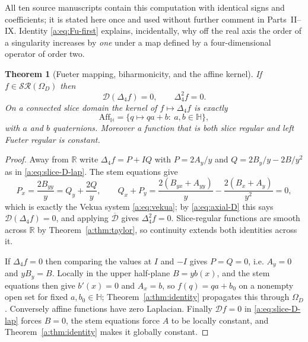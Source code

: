 \documentclass[11pt,a4paper]{article}
\numberwithin{equation}{section}
\newtheorem{theorem}{Theorem}[section]
\theoremstyle{definition}
\theoremstyle{remark}
\theoremstyle{plain}
\newcommand{\HH}{\mathbb H}
\newcommand{\RR}{\mathbb R}
\newcommand{\Dop}{\mathcal D}
\newcommand{\lap}{\Delta_4}
\newcommand{\SR}{\mathcal{SR}}
\newcommand{\Om}{\Omega}
\newcommand{\Aff}{\mathrm{Aff}_{\HH}}
\begin{document}
All ten source manuscripts contain this computation with identical signs and
coefficients; it is stated here once and used without further comment in
Parts~II--IX. Identity \eqref{a:eq:Fu-first} explains, incidentally, why off
the real axis the order of a singularity increases by \emph{one} under a map
defined by a four-dimensional operator of order two.

\begin{theorem}[Fueter mapping, biharmonicity, and the affine kernel]
\label{a:thm:fueter-map}
If $f\in\SR(\Om_D)$ then
\begin{equation}
 \Dop(\lap f)=0,\qquad \lap^2f=0 .
 \label{a:eq:fueter-map}
\end{equation}
On a connected slice domain the kernel of $f\mapsto\lap f$ is exactly
\[
 \Aff=\{q\mapsto qa+b:\ a,b\in\HH\},
\]
with $a$ and $b$ \emph{quaternions}. Moreover a function that is both slice
regular and left Fueter regular is constant.
\end{theorem}

\begin{proof}
Away from $\RR$ write $\lap f=P+IQ$ with $P=2A_y/y$ and $Q=2B_y/y-2B/y^2$ as
in \eqref{a:eq:slice-D-lap}. The stem equations give
\[
 P_x=\frac{2B_{yy}}{y}=Q_y+\frac{2Q}{y},
 \qquad
 Q_x+P_y=\frac{2(B_{yx}+A_{yy})}{y}-\frac{2(B_x+A_y)}{y^2}=0,
\]
which is exactly the Vekua system \eqref{a:eq:vekua}; by
\eqref{a:eq:axial-D} this says $\Dop(\lap f)=0$, and applying
$\overline{\Dop}$ gives $\lap^2f=0$. Slice-regular functions are smooth
across $\RR$ by Theorem~\ref{a:thm:taylor}, so continuity extends both
identities across it.

If $\lap f=0$ then comparing the values at $I$ and $-I$ gives $P=Q=0$, i.e.
$A_y=0$ and $yB_y=B$. Locally in the upper half-plane $B=yb(x)$, and the stem
equations then give $b'(x)=0$ and $A_x=b$, so $f(q)=qa+b_0$ on a nonempty open
set for fixed $a,b_0\in\HH$; Theorem~\ref{a:thm:identity} propagates this
through $\Om_D$. Conversely affine functions have zero Laplacian. Finally
$\Dop f=0$ in \eqref{a:eq:slice-D-lap} forces $B=0$, the stem equations force
$A$ to be locally constant, and Theorem~\ref{a:thm:identity} makes it
globally constant.
\end{proof}
\end{document}
